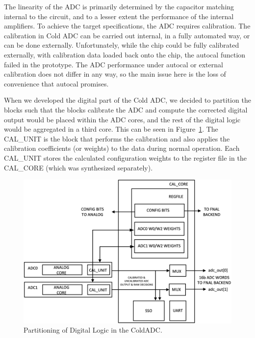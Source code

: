 \label{sec:5.1}


The linearity of the ADC is primarily determined by the capacitor matching internal to the circuit, and to a lesser extent the performance of the internal amplifiers. To achieve the target specifications, the ADC requires calibration. The calibration in Cold ADC can be carried out internal, in a fully automated way, or can be done externally. Unfortunately, while the chip could be fully calibrated externally, with calibration data loaded back onto the chip, the autocal function failed in the prototype. The ADC performance under autocal or external calibration does not differ in any way, so the main issue here is the loss of convenience that autocal promises.

When we developed the digital part of the Cold ADC, we decided to partition the blocks such that the blocks calibrate the ADC and compute the corrected digital output would be placed within the ADC cores, and the rest of the digital logic would be aggregated in a third core. This can be seen in Figure~\ref{fig:autocalBlock}. The CAL\_UNIT is the block that performs the calibration and also applies the calibration coefficients (or weights) to the data during normal operation. Each CAL\_UNIT stores the calculated configuration weights to the register file in the CAL\_CORE (which was synthesized separately).

\begin{figure}[htb]
\centering
\begin{center}
\includegraphics[width=1.0\textwidth]{figures/autocalBlock.png}
\end{center}
\caption{Partitioning of Digital Logic in the ColdADC.}
\label{fig:autocalBlock}
\end{figure}


